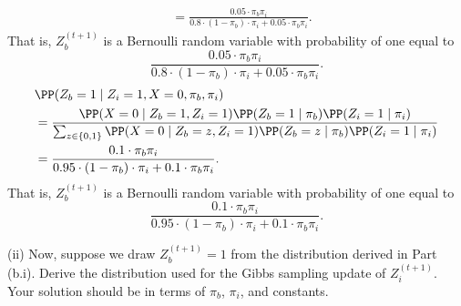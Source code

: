 \documentclass[a4paper,twoside,11pt]{article}
\begin{document}
\begin{parts}
\begin{solution}
{{\begin{align*}
            & = \frac{0.05 \cdot \pi_b \pi_i}{0.8 \cdot (1 -\pi_b) \cdot \pi_i + 0.05 \cdot \pi_b \pi_i}.
        \end{align*}
        That is, $Z_b^{(t + 1)}$ is a Bernoulli random variable with probability of one equal to
        $$
        \frac{0.05 \cdot \pi_b \pi_i}{0.8 \cdot (1 -\pi_b) \cdot \pi_i + 0.05 \cdot \pi_b \pi_i}.
        $$
        }
        {
        \begin{align*}
            & \PP(Z_b = 1 \mid Z_i = 1, X = 0, \pi_b, \pi_i) \\
            & = \frac{\PP(X = 0\mid Z_b = 1, Z_i = 1) \PP(Z_b = 1 \mid \pi_b) \PP(Z_i = 1 \mid \pi_i)}{\sum_{z \in \{0, 1\}}\PP(X = 0\mid Z_b=z, Z_i = 1) \PP(Z_b=z \mid \pi_b)\PP(Z_i =1\mid \pi_i)} \\  
            & = \frac{0.1 \cdot \pi_b \pi_i}{0.95 \cdot (1 -\pi_b) \cdot \pi_i + 0.1 \cdot \pi_b \pi_i}.
        \end{align*}
        That is, $Z_b^{(t + 1)}$ is a Bernoulli random variable with probability of one equal to
        $$
        \frac{0.1 \cdot \pi_b \pi_i}{0.95 \cdot (1 -\pi_b) \cdot \pi_i + 0.1 \cdot \pi_b \pi_i}.
        $$
        }
        }
        \end{solution}
        
        \newpage
        
        (ii) Now, suppose we draw $Z_b^{(t + 1)} = 1$ from the distribution derived in Part (b.i). Derive the distribution used for the Gibbs sampling update of $Z_i^{(t + 1)}$. Your solution should be in terms of $\pi_b$, $\pi_i$, and constants.
        
        \begin{solution}
        

\end{solution}
\end{parts}
\end{document}
